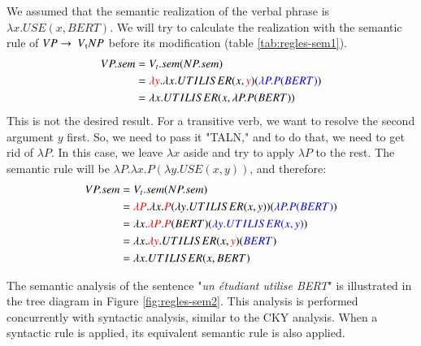 \documentclass{KBook}
\begin{document}
We assumed that the semantic realization of the verbal phrase is $\lambda x.USE(x, BERT)$. 
We will try to calculate the realization with the semantic rule of $VP \rightarrow\ V\textsubscript{t} NP$ before its modification (table \ref{tab:regles-sem1}).
\begin{align*}
VP.sem & = V_t.sem(NP.sem )\\
& = \textcolor{red}{\lambda y}.\lambda x.UTILISER(x, \textcolor{red}{y})(\textcolor{blue}{\lambda P.P(BERT)})\\
& = \lambda x.UTILISER(x, \lambda P.P(BERT))
\end{align*}
This is not the desired result. For a transitive verb, we want to resolve the second argument $y$ first. So, we need to pass it "TALN," and to do that, we need to get rid of $\lambda P$. In this case, we leave $\lambda x$ aside and try to apply $\lambda P$ to the rest. The semantic rule will be $\lambda P.\lambda x.P(\lambda y.USE(x, y))$, and therefore:
\begin{align*}
VP.sem & = V_t.sem(NP.sem) \\
& = \textcolor{red}{\lambda P}.\lambda x.\textcolor{red}{P}(\lambda y.UTILISER(x, y))(\textcolor{blue}{\lambda P.P(BERT)}) \\
& = \lambda x.\textcolor{red}{\lambda P}.\textcolor{red}{P}(BERT)(\textcolor{blue}{\lambda y.UTILISER(x, y)}) \\
& = \lambda x.\textcolor{red}{\lambda y}.UTILISER(x, \textcolor{red}{y})(\textcolor{blue}{BERT}) \\
& = \lambda x.UTILISER(x, BERT) \\
\end{align*}

The semantic analysis of the sentence "\textit{un étudiant utilise BERT}" is illustrated in the tree diagram in Figure \ref{fig:regles-sem2}. This analysis is performed concurrently with syntactic analysis, similar to the CKY analysis. When a syntactic rule is applied, its equivalent semantic rule is also applied.
\end{document}
